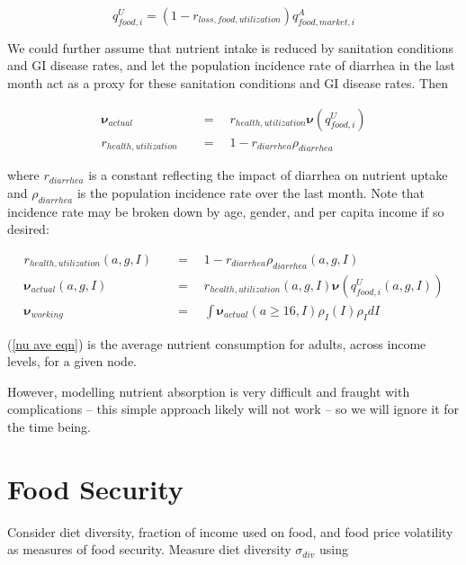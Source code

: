 \documentclass[letter,12pt]{article}
\begin{document}
\begin{equation}
q_{food,i}^U = \left(1-r_{loss,food,utilization}\right) q_{food,market,i}^A
\end{equation}

We could further assume that nutrient intake is reduced by sanitation conditions and GI disease rates, and let the population incidence rate of diarrhea in the last month act as a proxy for these sanitation conditions and GI disease rates.  Then

\begin{align}
\boldsymbol \nu_{actual} \quad &= \quad  r_{health,utilization} \boldsymbol \nu \left(q_{food,i}^U\right) \\
r_{health,utilization} \quad &= \quad  1 - r_{diarrhea} \rho_{diarrhea}
\end{align}

\noindent where $r_{diarrhea}$ is a constant reflecting the impact of diarrhea on nutrient uptake and $\rho_{diarrhea}$ is the population incidence rate over the last month.  Note that incidence rate may be broken down by age, gender, and per capita income if so desired:

\begin{align}
r_{health,utilization} \left(a,g,I\right) \quad &= \quad  1 - r_{diarrhea} \rho_{diarrhea}\left(a,g,I\right) \\
\boldsymbol \nu_{actual} \left(a,g,I\right) \quad &= \quad  r_{health,utilization}\left(a,g,I\right) \boldsymbol \nu \left( q_{food,i}^U \left(a,g,I\right) \right) \\
\boldsymbol \nu_{working} \quad &= \quad  \int \boldsymbol \nu_{actual} \left(a \geq 16,I\right) \rho_I \left(I\right) \rho_I dI \label{nu ave eqn}
\end{align}

(\ref{nu ave eqn}) is the average nutrient consumption for adults, across income levels, for a given node.

However, modelling nutrient absorption is very difficult and fraught with complications -- this simple approach likely will not work -- so we will ignore it for the time being.

\section{Food Security}

Consider diet diversity, fraction of income used on food, and food price volatility as measures of food security.  Measure diet diversity $\sigma_{div}$ using
\end{document}
